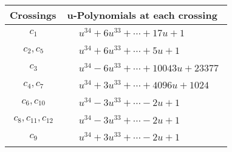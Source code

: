 \documentclass[1p]{elsarticle_modified}
\theoremstyle{definition}
\begin{document}
\begin{tabular}{m{50pt}|m{274pt}}
Crossings & \hspace{64pt}u-Polynomials at each crossing \\
\hline $$\begin{aligned}c_{1}\end{aligned}$$&$\begin{aligned}
&u^{34}+6 u^{33}+\cdots+17 u+1
\end{aligned}$\\
\hline $$\begin{aligned}c_{2},c_{5}\end{aligned}$$&$\begin{aligned}
&u^{34}+6 u^{33}+\cdots+5 u+1
\end{aligned}$\\
\hline $$\begin{aligned}c_{3}\end{aligned}$$&$\begin{aligned}
&u^{34}-6 u^{33}+\cdots+10043 u+23377
\end{aligned}$\\
\hline $$\begin{aligned}c_{4},c_{7}\end{aligned}$$&$\begin{aligned}
&u^{34}+3 u^{33}+\cdots+4096 u+1024
\end{aligned}$\\
\hline $$\begin{aligned}c_{6},c_{10}\end{aligned}$$&$\begin{aligned}
&u^{34}-3 u^{33}+\cdots-2 u+1
\end{aligned}$\\
\hline $$\begin{aligned}c_{8},c_{11},c_{12}\end{aligned}$$&$\begin{aligned}
&u^{34}-3 u^{33}+\cdots-2 u+1
\end{aligned}$\\
\hline $$\begin{aligned}c_{9}\end{aligned}$$&$\begin{aligned}
&u^{34}+3 u^{33}+\cdots-2 u+1
\end{aligned}$\\
\hline
\end{tabular}\\~\\
\newpage\renewcommand{\arraystretch}{1}
\end{document}
